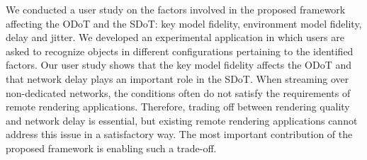 We conducted a user study on the factors involved in the proposed framework affecting the ODoT and the SDoT: key model fidelity, environment model fidelity, delay and jitter. We developed an experimental application in which users are asked to recognize objects in different configurations pertaining to the identified factors. Our user study shows that the key model fidelity affects the ODoT and that network delay plays an important role in the SDoT. When streaming over non-dedicated networks, the conditions often do not satisfy the requirements of remote rendering applications. Therefore, trading off between rendering quality and network delay is essential, but existing remote rendering applications cannot address this issue in a satisfactory way. The most important contribution of the proposed framework is enabling such a trade-off.
